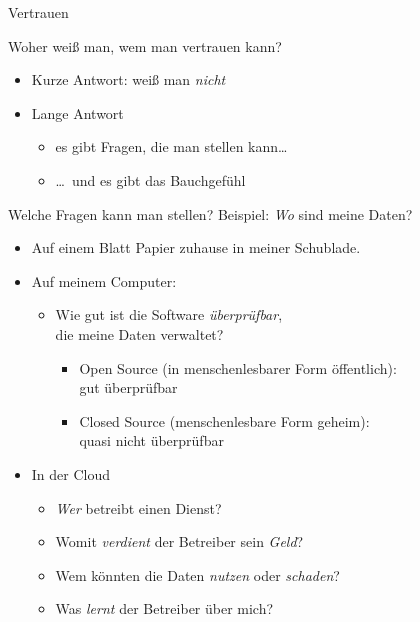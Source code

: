   \begin{frame}{Vertrauen}
    \begin{block}{Woher weiß man, wem man vertrauen kann?}
    \begin{itemize}
      \item Kurze Antwort: weiß man \emph{nicht}
      \item Lange Antwort
      \begin{itemize}
        \item es gibt Fragen, die man stellen kann\ldots
        \item \ldots\ und es gibt das Bauchgefühl
      \end{itemize}
    \end{itemize}
    \end{block}
  \end{frame}

  \begin{frame}{Welche Fragen kann man stellen?}
    Beispiel: \emph{Wo} sind meine Daten?
    \begin{itemize}
      \item Auf einem Blatt Papier zuhause in meiner Schublade.
      \item Auf meinem Computer:
      \begin{itemize}
        \item Wie gut ist die Software \emph{überprüfbar},\\ die meine Daten verwaltet?
        \begin{itemize}
          \item Open Source (in menschenlesbarer Form öffentlich):\\gut überprüfbar
          \item Closed Source (menschenlesbare Form geheim):\\quasi nicht überprüfbar
        \end{itemize}
      \end{itemize}
      \item In der Cloud
        \begin{itemize}
          \item \emph{Wer} betreibt einen Dienst?
          \item Womit \emph{verdient} der Betreiber sein \emph{Geld}?
          \item Wem könnten die Daten \emph{nutzen} oder \emph{schaden}?
          \item Was \emph{lernt} der Betreiber über mich?
        \end{itemize}
    \end{itemize}
  \end{frame}

